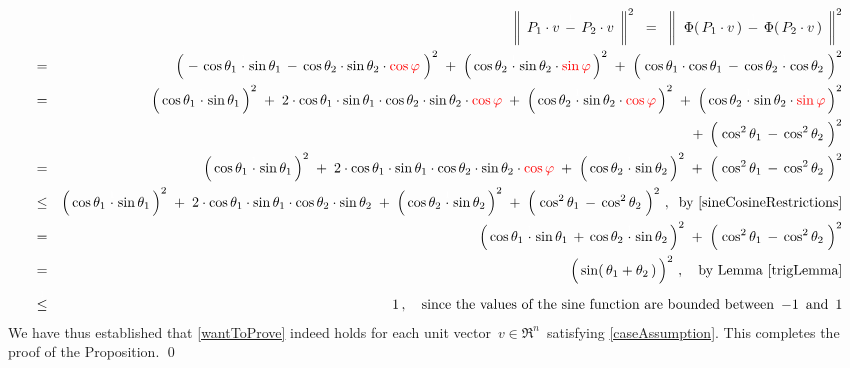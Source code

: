 \begin{eqnarray*}
&&
	\left\Vert\;\, P_{1}\cdot v \, \overset{{\color{white}1}}{-} \, P_{2}\cdot v \,\;\right\Vert^{2}
\;\; = \;\;
	\left\Vert\;\; \Phi(\,P_{1}\cdot v\,) \, \overset{{\color{white}1}}{-} \, \Phi(\,P_{2}\cdot v\,) \,\;\right\Vert^{2}
\\
& = &
	\left(\;
		-\,\cos\theta_{1}\overset{{\color{white}1}}{\cdot}\sin\theta_{1} \, - \, \cos\theta_{2}\cdot\sin\theta_{2}\cdot{\color{red}\cos\varphi}
		\;\right)^{2}
	\; + \;
	\left(\,\cos\theta_{2}\overset{{\color{white}1}}{\cdot}\sin\theta_{2}\cdot{\color{red}\sin\varphi}\,\right)^{2}
	\; + \;
	\left(\;
		\cos\theta_{1}\cdot\cos\theta_{1} \, - \, \cos\theta_{2}\overset{{\color{white}1}}{\cdot}\cos\theta_{2}
		\;\right)^{2}
\\
& = &
	\left(\,\cos\theta_{1}\overset{{\color{white}1}}{\cdot}\sin\theta_{1}\,\right)^{2}
	\; + \;
	2\cdot\cos\theta_{1}\cdot\sin\theta_{1}\cdot\cos\theta_{2}\cdot\sin\theta_{2}\cdot{\color{red}\cos\varphi}
	\; + \;
	\left(\,\cos\theta_{2}\overset{{\color{white}1}}{\cdot}\sin\theta_{2}\cdot{\color{red}\cos\varphi}\,\right)^{2}
	\; + \;
	\left(\,\cos\theta_{2}\overset{{\color{white}1}}{\cdot}\sin\theta_{2}\cdot{\color{red}\sin\varphi}\,\right)^{2}
\\
&&
	\; + \;
	\left(\; \cos^{2}\theta_{1} \, \overset{{\color{white}.}}{-} \, \cos^{2}\theta_{2} \;\right)^{2}
\\
& = &
	\left(\,\cos\theta_{1}\overset{{\color{white}1}}{\cdot}\sin\theta_{1}\,\right)^{2}
	\; + \;
	2\cdot\cos\theta_{1}\cdot\sin\theta_{1}\cdot\cos\theta_{2}\cdot\sin\theta_{2}\cdot{\color{red}\cos\varphi}
	\; + \;
	\left(\,\cos\theta_{2}\overset{{\color{white}1}}{\cdot}\sin\theta_{2}\,\right)^{2}
	\; + \;
	\left(\; \cos^{2}\theta_{1} \, \overset{{\color{white}.}}{-} \, \cos^{2}\theta_{2} \;\right)^{2}
\\
& \leq &
	\left(\,\cos\theta_{1}\overset{{\color{white}1}}{\cdot}\sin\theta_{1}\,\right)^{2}
	\; + \;
	2\cdot\cos\theta_{1}\cdot\sin\theta_{1}\cdot\cos\theta_{2}\cdot\sin\theta_{2}
	\; + \;
	\left(\,\cos\theta_{2}\overset{{\color{white}1}}{\cdot}\sin\theta_{2}\,\right)^{2}
	\; + \;
	\left(\; \cos^{2}\theta_{1} \, \overset{{\color{white}.}}{-} \, \cos^{2}\theta_{2} \;\right)^{2}\,,
	\;\;\textnormal{by \eqref{sineCosineRestrictions}}
\\
& = &
	\left(\,
		\cos\theta_{1}\overset{{\color{white}1}}{\cdot}\sin\theta_{1}
		\, + \,
		\cos\theta_{2}\overset{{\color{white}1}}{\cdot}\sin\theta_{2}
		\,\right)^{2}
	\; + \;
	\left(\; \cos^{2}\theta_{1} \, \overset{{\color{white}.}}{-} \, \cos^{2}\theta_{2} \;\right)^{2}
\\
& = &
	\left(\,\sin(\,\theta_{1} \overset{{\color{white}.}}{+} \theta_{2}\,) \,\right)^{2}\,,
	\quad\textnormal{by Lemma \ref{trigLemma}}
\\
& \overset{{\color{white}1}}{\leq} &
	1\,,
	\quad\textnormal{since the values of the sine function are bounded between \,$-1$\, and \,$1$}
\end{eqnarray*}
We have thus established that \eqref{wantToProve} indeed holds for each unit vector
\,$v \in \Re^{n}$\, satisfying \eqref{caseAssumption}.
This completes the proof of the Proposition.
\qed

